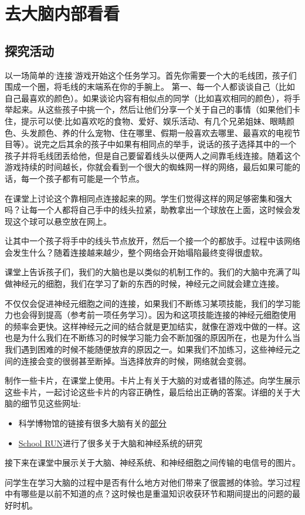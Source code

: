 \chapter{去大脑内部看看}
    
\section{探究活动}
    以一场简单的‘连接’游戏开始这个任务学习。首先你需要一个大的毛线团，孩子们围成一个圈，将毛线的末端系在你的手腕上。\pat
    第一、每一个人都谈谈自己（比如自己最喜欢的颜色）。如果谈论内容有相似点的同学（比如喜欢相同的颜色），将手举起来。从这些孩子中挑一个，然后让他们分享一个关于自己的事情（如果他们卡住，提示可以使:比如喜欢吃的食物、爱好、娱乐活动、有几个兄弟姐妹、眼睛颜色、头发颜色、养的什么宠物、住在哪里、假期一般喜欢去哪里、最喜欢的电视节目等）。说完之后其余的孩子中如果有相同点的举手，说话的孩子选择其中的一个孩子并将毛线团丢给他，但是自己要留着线头以便两人之间靠毛线连接。随着这个游戏持续的时间越长，你就会看到一个很大的蜘蛛网一样的网络，最后如果可能的话，每一个孩子都有可能是一个节点。\par
    在课堂上讨论这个靠相同点连接起来的网。学生们觉得这样的网足够密集和强大吗？让每一个人都将自己手中的线头拉紧，助教拿出一个球放在上面，这时候会发现这个球可以悬空放在网上。\par
    让其中一个孩子将手中的线头节点放开，然后一个接一个的都放手。过程中该网络会发生什么？随着连接越来越少，整个网络会开始塌陷最终变得很虚软。\par
    课堂上告诉孩子们，我们的大脑也是以类似的机制工作的。我们的大脑中充满了叫做神经元的细胞，我们在学习了新的东西的时候，神经元之间就会建立连接。\par
    不仅仅会促进神经元细胞之间的连接，如果我们不断练习某项技能，我们的学习能力也会得到提高（参考前一项任务学习）。因为和这项技能连接的神经元细胞使用的频率会更快。这样神经元之间的结合就是更加结实，就像在游戏中做的一样。这也是为什么我们在不断练习的时候学习能力会不断加强的原因所在，也是为什么当我们遇到困难的时候不能随便放弃的原因之一。如果我们不加练习，这些神经元之间的连接会变的很弱甚至断掉。当选择放弃的时候，网络就会变弱。\par
    制作一些卡片，在课堂上使用。卡片上有关于大脑的对或者错的陈述。向学生展示这些卡片，一起讨论这些卡片的内容正确性，最后给出正确的答案。详细的关于大脑的细节见这些网址:\par
    \begin{itemize}
      \item 科学博物馆的链接有很多大脑有关的\href{http://www.sciencemuseum.org.uk/whoami/findoutmore/yourbrain.aspx}{部分}
      \item \href{http://www.theschoolrun.com/homework-help/the-human-brain-andnervous-system}{School RUN}进行了很多关于大脑和神经系统的研究
    \end{itemize}  
    接下来在课堂中展示关于大脑、神经系统、和神经细胞之间传输的电信号的图片。\par
    问学生在学习大脑的过程中是否有什么地方对他们带来了很震撼的体验。学习过程中有哪些是以前不知道的点？这时候也是重温知识收获环节和期间提出的问题的最好时机。


